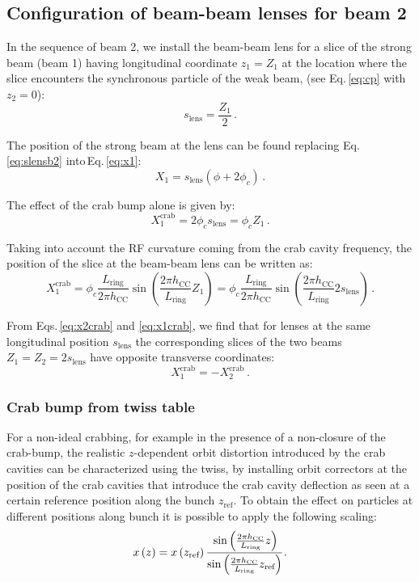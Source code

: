 \subsection{Configuration of beam-beam lenses for beam 2}
In the sequence of beam 2, we install the beam-beam lens for a slice of the strong beam (beam 1) having longitudinal coordinate $z_1=Z_1$ at the location where the slice encounters the synchronous particle of the weak beam, (see Eq.\,\eqref{eq:cp} with $z_2 = 0$):
\begin{equation}
    s_\text{lens} = \frac{Z_1}{2}
    \, .
    \label{eq:slensb2}
\end{equation}

The position of the strong beam at the lens can be found replacing Eq.\,\eqref{eq:slensb2} into\,Eq.\,\eqref{eq:x1}:
\begin{equation}
   X_1 = s_\text{lens} (\phi + 2 \phi_c)
   \, .
\end{equation}

The effect of the crab bump alone is given by:
\begin{equation}
   X^\text{crab}_1 = 2 \phi_c s_\text{lens} = \phi_c Z_1
   \, .
\end{equation}

Taking into account the RF curvature coming from the crab cavity frequency, the position of the slice at the beam-beam lens can be written as:
\begin{equation}
   X^\text{crab}_1 = \phi_c \frac{L_\text{ring}}{2 \pi h_\text{CC}} \sin\left(  \frac{2 \pi h_\text{CC}}{L_\text{ring}} Z_1\right) = \phi_c \frac{L_\text{ring}}{2 \pi h_\text{CC}} \sin\left(  \frac{2 \pi h_\text{CC}}{L_\text{ring}} 2 s_\text{lens}\right)
   \, .
   \label{eq:x1crab}
\end{equation}

From Eqs.\,\eqref{eq:x2crab} and \eqref{eq:x1crab}, we find that for lenses at the same longitudinal position $s_\text{lens}$ the corresponding slices of the two beams $Z_1 = Z_2 = 2 s_\text{lens}$ have opposite transverse coordinates:
\begin{equation}
X^\text{crab}_1= -X^\text{crab}_2
\, .
\end{equation}

\subsubsection{Crab bump from twiss table}

For a non-ideal crabbing, for example in the presence of a non-closure of the crab-bump, the realistic $z$-dependent  orbit distortion introduced by the crab cavities can be characterized using the twiss, by installing orbit correctors at the position of the crab cavities that introduce the crab cavity deflection as seen at a certain reference position along the bunch $z_\text{ref}$. 
To obtain the effect on particles at different positions along bunch it is possible to apply the following scaling:
\begin{equation}
x\left(z\right) = x\left(z_\text{ref}\right)
 \cfrac
 {\sin\left(  \frac{2 \pi h_\text{CC}}{L_\text{ring}} z\right)}
 {\sin\left(  \frac{2 \pi h_\text{CC}}{L_\text{ring}} z_\text{ref}\right)} 
 \, .
\end{equation}

